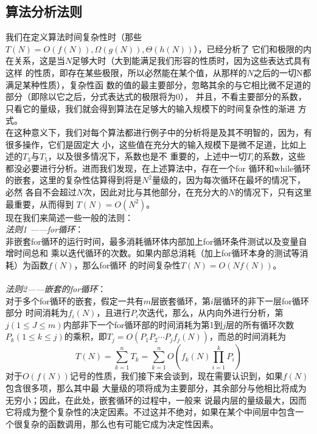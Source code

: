 \documentclass[a4paper,12pt]{ctexart}
\begin{document}
		\subsection{算法分析法则}
		\indent
		我们在定义算法时间复杂性时（那些$T(N)=O(f(N)),\Omega(g(N)),\Theta(h(N))$），已经分析了
		它们和极限的内在关系，这是当$N$足够大时（大到能满足我们形容的性质时，因为这些表达式具有这样
		的性质，即存在某些极限，所以必然能在某个值，从那样的$N$之后的一切N都满足某种性质），复杂性函
		数的值的最主要部分，忽略其余的与它相比微不足道的部分（即除以它之后，分式表达式的极限将为0），
		并且，不看主要部分的系数，只看它的量级，我们就会得到算法在足够大的输入规模下的时间复杂性的渐进
		方式。\\
		\indent
		在这种意义下，我们对每个算法都进行例子中的分析将是及其不明智的，因为，有很多操作，它们是固定大
		小，这些值在充分大的输入规模下是微不足道，比如上述的$T_3$与$T_5$，以及很多情况下，系数也是不
		重要的，上述中一切$T_i$的系数，这些都没必要进行分析。进而我们发现，在上述算法中，存在一个for
		循环和while循环的嵌套，这里的复杂性估算得到将是$N^2$量级的，因为每次循环在最坏的情况下，必然
		各自不会超过$N$次，因此对比与其他部分，在充分大的$N$的情况下，只有这里最重要，从而得到
		$T(N)=O(N^2)$。\\
		\indent
		现在我们来简述一些一般的法则：
		\\
		\indent \textit{法则1	——for循环}：
		\\
		\indent 非嵌套for循环的运行时间，最多消耗循环体内部加上for循环条件测试以及变量自增时间总和
		乘以迭代循环的次数。如果内部总消耗（加上for循环本身的测试等消耗）为函数$f(N)$，那么for循环
		的时间复杂性$T(N)=O(Nf(N))$。\\ \\
		\indent \textit{法则2——嵌套的for循环}： \\
		\indent 对于多个for循环的嵌套，假定一共有$m$层嵌套循环，第$i$层循环的非下一层for循环部分
		时间消耗为$f_i(N)$，且进行$P_i$次迭代，那么，从内向外进行分析，第$j(1 \leqslant J 
		\leqslant m)$内部非下一个for循环部的时间消耗为第1到$j$层的所有循环次数$P_k(1 
		\leqslant k \leqslant j)$的乘积，即$T_j=O(P_1P_2\cdots P_jf_j(N))$，而总的时间消耗为
		$$
		T(N)=\sum_{k=1}^nT_k=\sum_{k=1}^nO(f_k(N)\prod_{i=1}^kP_i)
		$$
		对于$O(f(N))$记号的性质，我们接下来会谈到，现在需要认识到，如果$f(N)$包含很多项，那么其中最
		大量级的项将成为主要部分，其余部分与他相比将成为无穷小；因此，在此处，嵌套循环的过程中，一般来
		说最内层的量级最大，因而它将成为整个复杂性的决定因素。不过这并不绝对，如果在某个中间层中包含一
		个很复杂的函数调用，那么也有可能它成为决定性因素。
		\\ \\
\end{document}
